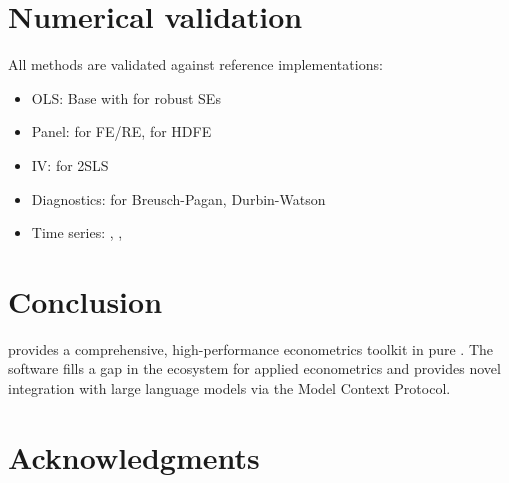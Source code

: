 \documentclass[article]{jss}
\newcommand{\fct}[1]{\code{#1()}}
\begin{document}
\section{Numerical validation} \label{sec:validation}


All methods are validated against reference  implementations:

\begin{itemize}
  \item OLS: Base  \fct{lm} with  for robust SEs
  \item Panel:  for FE/RE,  for HDFE
  \item IV:  \citep{AER} for 2SLS
  \item Diagnostics:  \citep{lmtest} for Breusch-Pagan, Durbin-Watson
  \item Time series: ,  \citep{vars},  \citep{urca}
\end{itemize}



\section{Conclusion} \label{sec:conclusion}


 provides a comprehensive, high-performance econometrics
toolkit in pure . The software fills a gap in the 
ecosystem for applied econometrics and provides novel integration with large
language models via the Model Context Protocol.



\section*{Acknowledgments}








\end{document}
